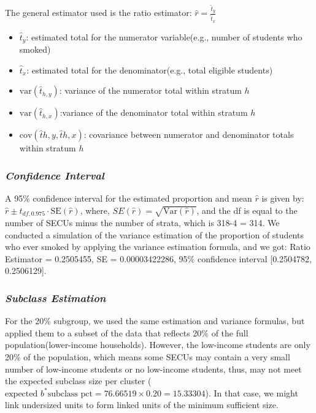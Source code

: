 \documentclass[
  12pt]{article}
\begin{document}
The general estimator used is the ratio estimator:
\(\hat{r} = \frac{\hat{t}_y}{\hat{t}_x}\)

\begin{itemize}
\item
  \(\hat{t}_y\): estimated total for the numerator variable(e.g., number
  of students who smoked)
\item
  \(\hat{t}_x\): estimated total for the denominator(e.g., total
  eligible students)
\item
  \(\text{var}(\hat{t}_{h,y})\): variance of the numerator total within
  stratum \(h\)
\item
  \(\text{var}(\hat{t}_{h,x})\):variance of the denominator total within
  stratum \(h\)
\item
  \(\text{cov}(\hat{t}{h,y}, \hat{t}{h,x})\): covariance between
  numerator and denominator totals within stratum \(h\)
\end{itemize}

\subsubsection{\texorpdfstring{\emph{Confidence
Interval}}{Confidence Interval}}\label{confidence-interval}

A 95\% confidence interval for the estimated proportion and mean
\(\hat{r}\) is given by:
\(\hat{r} \pm t_{df, 0.975} \cdot \text{SE}(\hat{r})\), where,
\(SE(\hat{r}) = \sqrt{\text{Var}(\hat{r})}\), and the df is equal to the
number of SECUs minus the number of strata, which is 318-4 = 314. We
conducted a simulation of the variance estimation of the proportion of
students who ever smoked by applying the variance estimation formula,
and we got: Ratio Estimator = 0.2505455, SE = 0.00003422286, 95\%
confidence interval {[}0.2504782, 0.2506129{]}.

\subsubsection{\texorpdfstring{\emph{Subclass
Estimation}}{Subclass Estimation}}\label{subclass-estimation}

For the 20\% subgroup, we used the same estimation and variance
formulas, but applied them to a subset of the data that reflects 20\% of
the full population(lower-income households). However, the low-income
students are only 20\% of the population, which means some SECUs may
contain a very small number of low-income students or no low-income
students, thus, may not meet the expected subclass size per cluster (
\(\text{expected }b^* \text{subclass pct} = 76.66519 \times 0.20 = 15.33304\)).
In that case, we might link undersized units to form linked units of the
minimum sufficient size.
\end{document}
